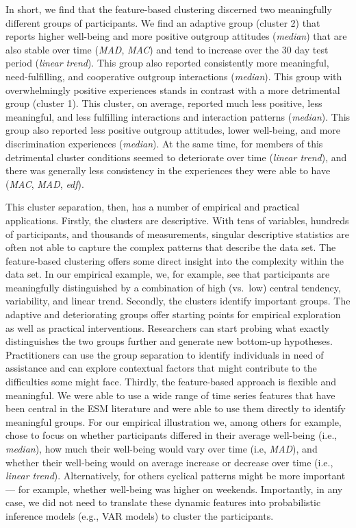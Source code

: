 In short, we find that the feature-based clustering discerned two
meaningfully different groups of participants. We find an adaptive group
(cluster 2) that reports higher well-being and more positive outgroup
attitudes (\textit{median}) that are also stable over time
(\textit{MAD}, \textit{MAC}) and tend to increase over the 30 day test
period (\textit{linear trend}). This group also reported consistently
more meaningful, need-fulfilling, and cooperative outgroup interactions
(\textit{median}). This group with overwhelmingly positive experiences
stands in contrast with a more detrimental group (cluster 1). This
cluster, on average, reported much less positive, less meaningful, and
less fulfilling interactions and interaction patterns (\textit{median}).
This group also reported less positive outgroup attitudes, lower
well-being, and more discrimination experiences (\textit{median}). At
the same time, for members of this detrimental cluster conditions seemed
to deteriorate over time (\textit{linear trend}), and there was
generally less consistency in the experiences they were able to have
(\textit{MAC}, \textit{MAD}, \textit{edf}).

This cluster separation, then, has a number of empirical and practical
applications. Firstly, the clusters are descriptive. With tens of
variables, hundreds of participants, and thousands of measurements,
singular descriptive statistics are often not able to capture the
complex patterns that describe the data set. The feature-based
clustering offers some direct insight into the complexity within the
data set. In our empirical example, we, for example, see that
participants are meaningfully distinguished by a combination of high
(vs.~low) central tendency, variability, and linear trend. Secondly, the
clusters identify important groups. The adaptive and deteriorating
groups offer starting points for empirical exploration as well as
practical interventions. Researchers can start probing what exactly
distinguishes the two groups further and generate new bottom-up
hypotheses. Practitioners can use the group separation to identify
individuals in need of assistance and can explore contextual factors
that might contribute to the difficulties some might face. Thirdly, the
feature-based approach is flexible and meaningful. We were able to use a
wide range of time series features that have been central in the ESM
literature and were able to use them directly to identify meaningful
groups. For our empirical illustration we, among others for example,
chose to focus on whether participants differed in their average
well-being (i.e., \textit{median}), how much their well-being would vary
over time (i.e, \textit{MAD}), and whether their well-being would on
average increase or decrease over time (i.e., \textit{linear trend}).
Alternatively, for others cyclical patterns might be more important ---
for example, whether well-being was higher on weekends. Importantly, in
any case, we did not need to translate these dynamic features into
probabilistic inference models (e.g., VAR models) to cluster the
participants.

